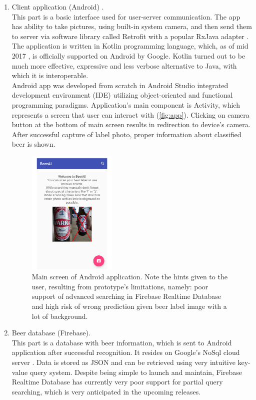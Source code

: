 \documentclass[11pt]{article}
\begin{document}
\begin{enumerate}[1)]
\item Client application (Android) \cite{android_app_repo}. \\
This part is a basic interface used for user-server communication. The app has ability to take pictures, using built-in system camera, and then send them to server via software library called Retrofit \cite{retrofit_repo} with a popular RxJava adapter \cite{rxjava_repo}. The application is written in Kotlin programming language, which, as of mid 2017 \cite{kotlin_blogpost}, is officially supported on Android by Google. Kotlin turned out to be much more effective, expressive and less verbose alternative to Java, with which it is interoperable.\\

Android app was developed from scratch in Android Studio integrated development environment (IDE) utilizing object-oriented and functional programming paradigms. Application's main component is Activity, which represents a screen that user can interact with (\autoref{fig:app}). Clicking on camera button at the bottom of main screen results in redirection to device's camera. After successful capture of label photo, proper information about classified beer is shown. 

\begin{figure}[h]
\includegraphics[width=0.4\textwidth]{app}
\centering
\caption{Main screen of Android application. Note the hints given to the user, resulting from prototype's limitations, namely: poor support of advanced searching in Firebase Realtime Database and high risk of wrong prediction given beer label image with a lot of background.}
\label{fig:app}
\end{figure}

\item Beer database (Firebase).\\
This part is a database with beer information, which is sent to Android application after successful recognition. It resides on Google's NoSql cloud server \cite{nosql_def}. Data is stored as JSON and can be retrieved using very intuitive key-value query system. Despite being simple to launch and maintain, Firebase Realtime Database has currently very poor support for partial query searching, which is very anticipated in the upcoming releases.\\


\end{enumerate}
\end{document}
